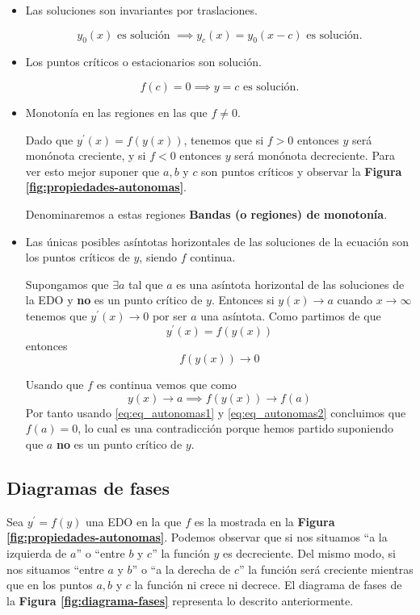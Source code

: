 \documentclass{mathnotes}
\begin{document}

\begin{itemize}
\item Las soluciones son invariantes por traslaciones.

$$y_0(x) \text{ es solución } \implies y_c(x) = y_0(x-c) \text{ es solución.}$$

\item Los puntos críticos o estacionarios son solución.

$$f(c) = 0 \implies y=c \text{ es solución.}$$

\item Monotonía en las regiones en las que $f\neq 0$.

Dado que $y^\prime(x) = f(y(x))$, tenemos que si $f\gt0$ entonces $y$ será monónota creciente, y si $f\lt0$ entonces $y$ será monónota decreciente. Para ver esto mejor suponer que $a,b$ y $c$ son puntos críticos y observar la \textbf{Figura \ref{fig:propiedades-autonomas}}.

Denominaremos a estas regiones \textbf{Bandas (o regiones) de monotonía}.

\item Las únicas posibles asíntotas horizontales de las soluciones de la ecuación son los puntos críticos de $y$, siendo $f$ continua.

Supongamos que $\exists a $ tal que $a$ es una asíntota horizontal de las soluciones de la EDO y \textbf{no} es un punto crítico de $y$. Entonces si $y(x)\to a$ cuando $x\to \infty$ tenemos que $y^\prime(x)\to 0$ por ser $a$ una asíntota. Como partimos de que $$y^\prime(x) = f(y(x))$$ entonces
\begin{equation}
f(y(x))\to 0
\label{eq:eq_autonomas1}
\end{equation}

Usando que $f$ es continua vemos que como 
\begin{equation}
y(x)\to a \implies f(y(x))\to f(a)
\label{eq:eq_autonomas2}
\end{equation}
Por tanto usando \ref{eq:eq_autonomas1} y \ref{eq:eq_autonomas2} concluimos que $f(a) = 0$, lo cual es una contradicción porque hemos partido suponiendo que $a$ \textbf{no} es un punto crítico de $y$.
\end{itemize}

\subsection{Diagramas de fases}
Sea $y^\prime = f(y)$ una EDO en la que $f$ es la mostrada en la \textbf{Figura \ref{fig:propiedades-autonomas}}. Podemos observar que si nos situamos ``a la izquierda de $a$'' o ``entre $b$ y $c$'' la función $y$ es decreciente. Del mismo modo, si nos situamos ``entre $a$ y $b$'' o ``a la derecha de $c$'' la función será creciente mientras que en los puntos $a, b$ y $c$ la función ni crece ni decrece. El diagrama de fases de la \textbf{Figura \ref{fig:diagrama-fases}} representa lo descrito anteriormente. 
\end{document}
